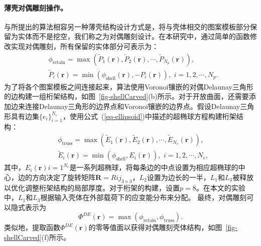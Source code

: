 \paragraph{薄壳对偶雕刻操作。}
与所提出的算法相容另一种薄壳结构设计方式是，将与壳体相交的图案模板部分保留为实体而不是挖空，我们称之为对偶雕刻设计。在本研究中，通过简单的函数修改实现对偶雕刻，所有保留的实体部分可表示为：
\begin{equation}
    \begin{split}
        &\phi_{\mathrm{retain}}=\max(\tilde{P}_1(\mathbf{r}), \tilde{P}_2(\mathbf{r}), \cdots, \tilde{P}_{N_p}(\mathbf{r})),\\
        &\tilde{P}_i(\mathbf{r})=\min(\phi_{\mathrm{shell}}(\mathbf{r}), -P_i(\mathbf{r})), \,\, i=1,2,\cdots, N_p.
    \end{split}
\end{equation}
为了将各个图案模板之间连接起来，算法使用Voronoi镶嵌的对偶Delaunay三角形的边构建一组桁架结构，如图~\ref{fig-shellCarved}(b)所示。对于开放曲面，还需要添加边来连接Delaunay三角形的边界点和Voronoi镶嵌的边界点。假设Delaunay三角形具有边集$\{e_i\}_{i=1}^{N_e}$，使用公式~(\ref{eq-ellipsoid})中描述的超椭球方程构建桁架结构：
\begin{equation}
    \begin{split}
        &\phi_{\mathrm{truss}} = \max(\tilde{E}_1(\mathbf{r}), \tilde{E}_2(\mathbf{r}), \cdots, \tilde{E}_{N_e}(\mathbf{r})),\\
        &\tilde{E}_i(\mathbf{r})=\min(\phi_{\mathrm{shell}},E_i(\mathbf{r})),\,\, i = 1, 2, \cdots, N_e,
    \end{split}
\end{equation}
其中，${E_i(\mathbf{r})}{i=1}^{N_e}$是一系列超椭球，将每条边的中点设置为相应超椭球的中心，边的方向决定了旋转矩阵$\mathbf{R}={R{ij}}_{3\times 3}$，$L_2$设置为边长的一半，$L_1$和$L_3$被释放以优化调整桁架结构的局部厚度。对于桁架的构建，设置$p=8$。在本文的实验中，$L_1$和$L_3$根据输入壳体在外部载荷下的应变能分布来分配。
最终，对偶雕刻可以隐式表示为
\begin{equation}
	\Phi^{DE}(\mathbf{r})=\max(\phi_{\mathrm{retain}}, \phi_{\mathrm{truss}}).
\end{equation}
类似地，提取函数$\Phi^{DE}(\mathbf{r})$的零等值面以获得对偶雕刻壳体结构，如图~\ref{fig-shellCarved}(f)所示。